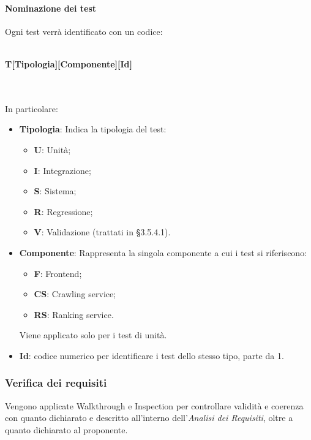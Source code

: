 \paragraph{Nominazione dei test}
Ogni test verrà identificato con un codice: \\ \\
\centerline{\textbf{T[Tipologia][Componente][Id]}} \\ \\
In particolare:
\begin{itemize}
\item \textbf{Tipologia}: Indica la tipologia del test:
	\begin{itemize}
	\item \textbf{U}: Unità;
	\item \textbf{I}: Integrazione;
	\item \textbf{S}: Sistema;
	\item \textbf{R}: Regressione;
	\item \textbf{V}: Validazione (trattati in §3.5.4.1).
	\end{itemize}
	
\item \textbf{Componente}: Rappresenta la singola componente a cui i test si riferiscono:
	\begin{itemize}
	\item \textbf{F}: Frontend;
	\item \textbf{CS}: Crawling service;
	\item \textbf{RS}: Ranking service.
	\end{itemize}
	Viene applicato solo per i test di unità. 	
	
\item \textbf{Id}: codice numerico per identificare i test dello stesso tipo, parte da 1.

\end{itemize}


\subsubsection{Verifica dei requisiti}
Vengono applicate Walkthrough e Inspection per controllare validità e coerenza con quanto dichiarato e descritto all'interno dell'\textit{Analisi dei Requisiti}, oltre a quanto dichiarato al proponente.


